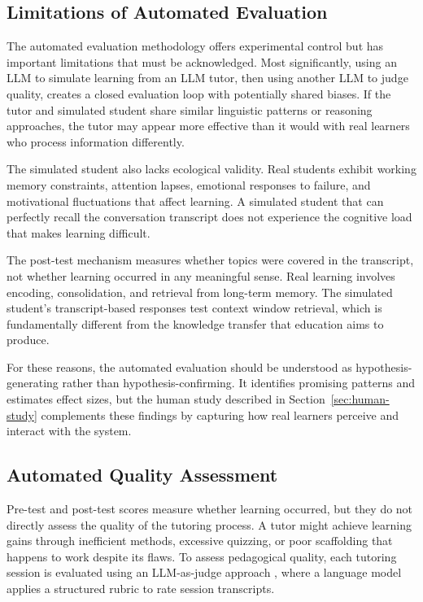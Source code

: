 \documentclass[logo,bsc,singlespacing,parskip,online]{infthesis}
\begin{document}
\subsection{Limitations of Automated Evaluation}

The automated evaluation methodology offers experimental control but has important limitations that must be acknowledged. Most significantly, using an LLM to simulate learning from an LLM tutor, then using another LLM to judge quality, creates a closed evaluation loop with potentially shared biases. If the tutor and simulated student share similar linguistic patterns or reasoning approaches, the tutor may appear more effective than it would with real learners who process information differently.

The simulated student also lacks ecological validity. Real students exhibit working memory constraints, attention lapses, emotional responses to failure, and motivational fluctuations that affect learning. A simulated student that can perfectly recall the conversation transcript does not experience the cognitive load that makes learning difficult.

The post-test mechanism measures whether topics were covered in the transcript, not whether learning occurred in any meaningful sense. Real learning involves encoding, consolidation, and retrieval from long-term memory. The simulated student's transcript-based responses test context window retrieval, which is fundamentally different from the knowledge transfer that education aims to produce.

For these reasons, the automated evaluation should be understood as hypothesis-generating rather than hypothesis-confirming. It identifies promising patterns and estimates effect sizes, but the human study described in Section~\ref{sec:human-study} complements these findings by capturing how real learners perceive and interact with the system.

\subsection{Automated Quality Assessment}
\label{sec:expert-judge}

Pre-test and post-test scores measure whether learning occurred, but they do not directly assess the quality of the tutoring process. A tutor might achieve learning gains through inefficient methods, excessive quizzing, or poor scaffolding that happens to work despite its flaws. To assess pedagogical quality, each tutoring session is evaluated using an LLM-as-judge approach \citep{zheng2023judging}, where a language model applies a structured rubric to rate session transcripts.
\end{document}
